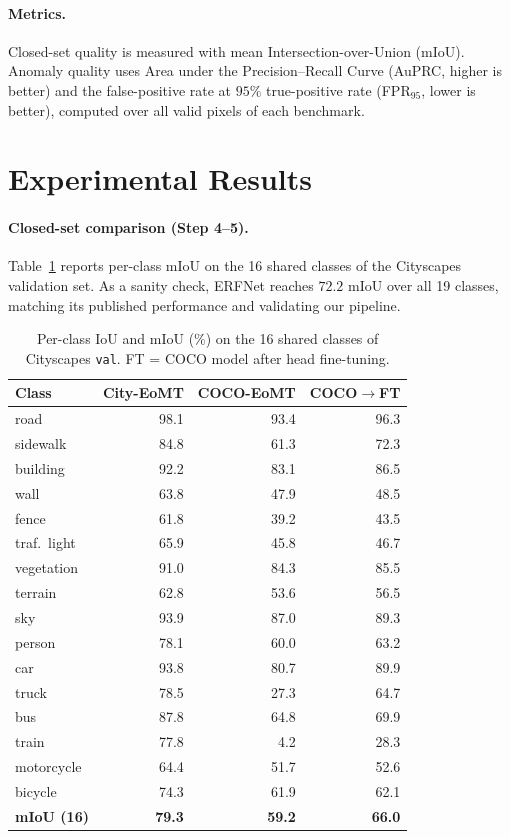 \documentclass[10pt,twocolumn]{article}
\begin{document}
\paragraph{Metrics.}
Closed-set quality is measured with mean Intersection-over-Union (mIoU).
Anomaly quality uses Area under the Precision--Recall Curve (AuPRC, higher is
better) and the false-positive rate at $95\%$ true-positive rate
(FPR$_{95}$, lower is better), computed over all valid pixels of each benchmark.

\section{Experimental Results}

\paragraph{Closed-set comparison (Step 4--5).}
Table~\ref{tab:miou} reports per-class mIoU on the 16 shared classes of the
Cityscapes validation set. As a sanity check, ERFNet reaches $72.2$ mIoU over
all 19 classes, matching its published performance and validating our pipeline.

\begin{table}[t]
\centering
\caption{Per-class IoU and mIoU (\%) on the 16 shared classes of Cityscapes
\texttt{val}. FT = COCO model after head fine-tuning.}
\label{tab:miou}
\small
\begin{tabular}{l r r r}
\toprule
Class & City-EoMT & COCO-EoMT & COCO$\to$FT \\
\midrule
road       & 98.1 & 93.4 & 96.3 \\
sidewalk   & 84.8 & 61.3 & 72.3 \\
building   & 92.2 & 83.1 & 86.5 \\
wall       & 63.8 & 47.9 & 48.5 \\
fence      & 61.8 & 39.2 & 43.5 \\
traf.\ light & 65.9 & 45.8 & 46.7 \\
vegetation & 91.0 & 84.3 & 85.5 \\
terrain    & 62.8 & 53.6 & 56.5 \\
sky        & 93.9 & 87.0 & 89.3 \\
person     & 78.1 & 60.0 & 63.2 \\
car        & 93.8 & 80.7 & 89.9 \\
truck      & 78.5 & 27.3 & 64.7 \\
bus        & 87.8 & 64.8 & 69.9 \\
train      & 77.8 &  4.2 & 28.3 \\
motorcycle & 64.4 & 51.7 & 52.6 \\
bicycle    & 74.3 & 61.9 & 62.1 \\
\midrule
\textbf{mIoU (16)} & \textbf{79.3} & \textbf{59.2} & \textbf{66.0} \\
\bottomrule
\end{tabular}
\end{table}
\end{document}
